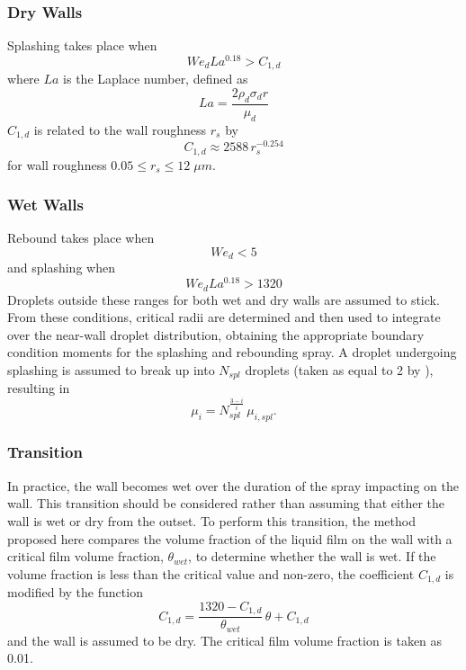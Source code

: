 \documentclass[a4paper,10pt]{article}
\begin{document}
\subsubsection{Dry Walls}
Splashing takes place when
\begin{equation}
We_{d} La^{0.18} > C_{1,d}
\end{equation}
where $La$ is the Laplace number, defined as
\begin{equation}
La = \frac{2 \rho_d \sigma_d r}{\mu_d}
\end{equation}
$C_{1,d}$ is related to the wall roughness $r_s$ by
\begin{equation}
C_{1,d} \approx 2588 \,r_s^{-0.254}
\end{equation}
for wall roughness $0.05 \leq r_s \leq 12 \; \mu m$.



\subsubsection{Wet Walls}
Rebound takes place when
\begin{equation}
We_{d} < 5
\end{equation}
and splashing when
\begin{equation}
We_{d} La^{0.18} > 1320
\end{equation}
Droplets outside these ranges for both wet and dry walls are assumed to stick.  From these conditions, critical radii are determined and then used to integrate over the near-wall droplet distribution, obtaining the appropriate boundary condition moments for the splashing and rebounding spray.
A droplet undergoing splashing is assumed to break up into $N_{spl}$ droplets (taken as equal to 2 by \cite{lemini2002}), resulting in
\begin{equation}
\mu_{i} = N_{spl}^{\frac{3-i}{i}} \, \mu_{i,spl}.
\end{equation}



\subsubsection{Transition}
In practice, the wall becomes wet over the duration of the spray impacting on the wall.  This transition should be considered rather than assuming that either the wall is wet or dry from the outset.  To perform this transition, the method proposed here compares the volume fraction of the liquid film on the wall with a critical film volume fraction, $\theta_{wet}$, to determine whether the wall is wet.  If the volume fraction is less than the critical value and non-zero, the coefficient $C_{1,d}$ is modified by the function
\begin{equation}
C_{1,d}=\frac{1320-C_{1,d}}{\theta_{wet}} \, \theta + C_{1,d}
\end{equation}
and the wall is assumed to be dry.  The critical film volume fraction is taken as 0.01.
\end{document}
